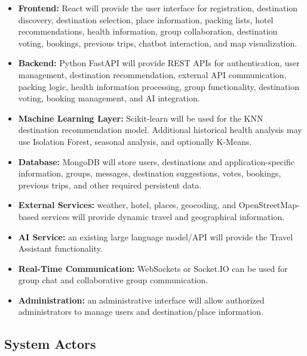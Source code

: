 \documentclass[11pt,a4paper]{article}
\begin{document}
\begin{itemize}

\item \textbf{Frontend:} React will provide the user interface for registration, destination discovery, destination selection, place information, packing lists, hotel recommendations, health information, group collaboration, destination voting, bookings, previous trips, chatbot interaction, and map visualization.

\item \textbf{Backend:} Python FastAPI will provide REST APIs for authentication, user management, destination recommendation, external API communication, packing logic, health information processing, group functionality, destination voting, booking management, and AI integration.

\item \textbf{Machine Learning Layer:} Scikit-learn will be used for the KNN destination recommendation model. Additional historical health analysis may use Isolation Forest, seasonal analysis, and optionally K-Means.

\item \textbf{Database:} MongoDB will store users, destinations and application-specific information, groups, messages, destination suggestions, votes, bookings, previous trips, and other required persistent data.

\item \textbf{External Services:} weather, hotel, places, geocoding, and OpenStreetMap-based services will provide dynamic travel and geographical information.

\item \textbf{AI Service:} an existing large language model/API will provide the Travel Assistant functionality.

\item \textbf{Real-Time Communication:} WebSockets or Socket.IO can be used for group chat and collaborative group communication.

\item \textbf{Administration:} an administrative interface will allow authorized administrators to manage users and destination/place information.

\end{itemize}


\subsection{System Actors}
\end{document}
